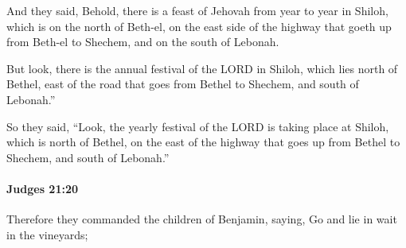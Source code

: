 			\begin{versebox}
					\item[BHS] 
					\item[ASV] And they said, Behold, there is a feast of Jehovah from year to year in Shiloh, which is on the north of Beth-el, on the east side of the highway that goeth up from Beth-el to Shechem, and on the south of Lebonah.
					\item[NIV] But look, there is the annual festival of the LORD in Shiloh, which lies north of Bethel, east of the road that goes from Bethel to Shechem, and south of Lebonah.”
					\item[NRSV] So they said, “Look, the yearly festival of the LORD is taking place at Shiloh, which is north of Bethel, on the east of the highway that goes up from Bethel to Shechem, and south of Lebonah.”
			\end{versebox}

		\paragraph{Judges 21:20} %
			\label{JUDGES-21-20}

			Therefore they commanded the children of Benjamin, saying, Go and lie in wait in the vineyards;

